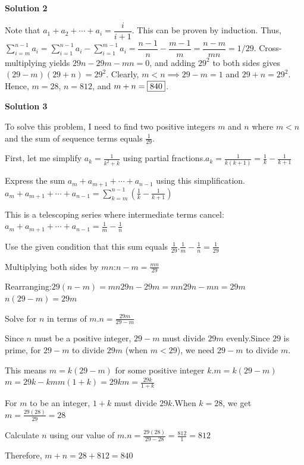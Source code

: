\begin{enumerate}
\textbf{Solution 2}

Note that $a_1 + a_2 + \cdots + a_i = \dfrac{i}{i+1}$. This can be proven by induction. Thus, $\sum\limits_{i=m}^{n-1} a_i = \sum\limits_{i=1}^{n-1} a_i - \sum\limits_{i=1}^{m-1} a_i = \dfrac{n-1}{n} - \dfrac{m-1}{m} = \dfrac{n-m}{mn} = 1/29$. Cross-multiplying yields $29n - 29m - mn = 0$, and adding $29^2$ to both sides gives $(29-m)(29+n) = 29^2$. Clearly, $m < n \implies 29 - m = 1$ and $29 + n = 29^2$. Hence, $m = 28$, $n = 812$, and $m+n = \fbox{840}$.

 



\textbf{Solution 3}

To solve this problem, I need to find two positive integers $m$ and $n$ where $m < n$ and the sum of sequence terms equals $\frac{1}{29}$.

 First, let me simplify $a_k = \frac{1}{k^2 + k}$ using partial fractions.$a_k = \frac{1}{k(k+1)} = \frac{1}{k} - \frac{1}{k+1}$

 Express the sum $a_m + a_{m+1} + \cdots + a_{n-1}$ using this simplification.$a_m + a_{m+1} + \cdots + a_{n-1} = \sum_{k=m}^{n-1} \left(\frac{1}{k} - \frac{1}{k+1}\right)$

 This is a telescoping series where intermediate terms cancel:$a_m + a_{m+1} + \cdots + a_{n-1} = \frac{1}{m} - \frac{1}{n}$

 Use the given condition that this sum equals $\frac{1}{29}$.$\frac{1}{m} - \frac{1}{n} = \frac{1}{29}$

 Multiplying both sides by $mn$:$n - m = \frac{mn}{29}$

 Rearranging:$29(n - m) = mn$$29n - 29m = mn$$29n - mn = 29m$$n(29 - m) = 29m$

 Solve for $n$ in terms of $m$.$n = \frac{29m}{29-m}$

 Since $n$ must be a positive integer, $29-m$ must divide $29m$ evenly.Since $29$ is prime, for $29-m$ to divide $29m$ (when $m < 29$), we need $29-m$ to divide $m$.

 This means $m = k(29-m)$ for some positive integer $k$.$m = k(29-m)$$m = 29k - km$$m(1+k) = 29k$$m = \frac{29k}{1+k}$

 For $m$ to be an integer, $1+k$ must divide $29k$.When $k = 28$, we get $m = \frac{29(28)}{29} = 28$

 Calculate $n$ using our value of $m$.$n = \frac{29(28)}{29-28} = \frac{812}{1} = 812$

 Therefore, $m + n = 28 + 812 = \boxed{840}$




\end{enumerate}
